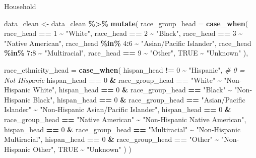 \documentclass[
]{article}
\newenvironment{Shaded}{\begin{snugshade}}{\end{snugshade}}
\newcommand{\AttributeTok}[1]{\textcolor[rgb]{0.13,0.29,0.53}{#1}}
\newcommand{\CommentTok}[1]{\textcolor[rgb]{0.56,0.35,0.01}{\textit{#1}}}
\newcommand{\ConstantTok}[1]{\textcolor[rgb]{0.56,0.35,0.01}{#1}}
\newcommand{\DecValTok}[1]{\textcolor[rgb]{0.00,0.00,0.81}{#1}}
\newcommand{\FunctionTok}[1]{\textcolor[rgb]{0.13,0.29,0.53}{\textbf{#1}}}
\newcommand{\NormalTok}[1]{#1}
\newcommand{\OtherTok}[1]{\textcolor[rgb]{0.56,0.35,0.01}{#1}}
\newcommand{\SpecialCharTok}[1]{\textcolor[rgb]{0.81,0.36,0.00}{\textbf{#1}}}
\newcommand{\StringTok}[1]{\textcolor[rgb]{0.31,0.60,0.02}{#1}}
\begin{document}
Household

\begin{Shaded}
\begin{Highlighting}[]
\NormalTok{data\_clean }\OtherTok{\textless{}{-}}\NormalTok{ data\_clean }\SpecialCharTok{\%\textgreater{}\%}
  \FunctionTok{mutate}\NormalTok{(}
    \AttributeTok{race\_group\_head =} \FunctionTok{case\_when}\NormalTok{(}
\NormalTok{      race\_head }\SpecialCharTok{==} \DecValTok{1} \SpecialCharTok{\textasciitilde{}} \StringTok{"White"}\NormalTok{,}
\NormalTok{      race\_head }\SpecialCharTok{==} \DecValTok{2} \SpecialCharTok{\textasciitilde{}} \StringTok{"Black"}\NormalTok{,}
\NormalTok{      race\_head }\SpecialCharTok{==} \DecValTok{3} \SpecialCharTok{\textasciitilde{}} \StringTok{"Native American"}\NormalTok{,}
\NormalTok{      race\_head }\SpecialCharTok{\%in\%} \DecValTok{4}\SpecialCharTok{:}\DecValTok{6} \SpecialCharTok{\textasciitilde{}} \StringTok{"Asian/Pacific Islander"}\NormalTok{,}
\NormalTok{      race\_head }\SpecialCharTok{\%in\%} \DecValTok{7}\SpecialCharTok{:}\DecValTok{8} \SpecialCharTok{\textasciitilde{}} \StringTok{"Multiracial"}\NormalTok{,}
\NormalTok{      race\_head }\SpecialCharTok{==} \DecValTok{9} \SpecialCharTok{\textasciitilde{}} \StringTok{"Other"}\NormalTok{,}
      \ConstantTok{TRUE} \SpecialCharTok{\textasciitilde{}} \StringTok{"Unknown"}
\NormalTok{    ),}
    
    \AttributeTok{race\_ethnicity\_head =} \FunctionTok{case\_when}\NormalTok{(}
\NormalTok{      hispan\_head }\SpecialCharTok{!=} \DecValTok{0} \SpecialCharTok{\textasciitilde{}} \StringTok{"Hispanic"}\NormalTok{,  }\CommentTok{\# 0 = Not Hispanic}
\NormalTok{      hispan\_head }\SpecialCharTok{==} \DecValTok{0} \SpecialCharTok{\&}\NormalTok{ race\_group\_head }\SpecialCharTok{==} \StringTok{"White"} \SpecialCharTok{\textasciitilde{}} \StringTok{"Non{-}Hispanic White"}\NormalTok{,}
\NormalTok{      hispan\_head }\SpecialCharTok{==} \DecValTok{0} \SpecialCharTok{\&}\NormalTok{ race\_group\_head }\SpecialCharTok{==} \StringTok{"Black"} \SpecialCharTok{\textasciitilde{}} \StringTok{"Non{-}Hispanic Black"}\NormalTok{,}
\NormalTok{      hispan\_head }\SpecialCharTok{==} \DecValTok{0} \SpecialCharTok{\&}\NormalTok{ race\_group\_head }\SpecialCharTok{==} \StringTok{"Asian/Pacific Islander"} \SpecialCharTok{\textasciitilde{}} \StringTok{"Non{-}Hispanic Asian/Pacific Islander"}\NormalTok{,}
\NormalTok{      hispan\_head }\SpecialCharTok{==} \DecValTok{0} \SpecialCharTok{\&}\NormalTok{ race\_group\_head }\SpecialCharTok{==} \StringTok{"Native American"} \SpecialCharTok{\textasciitilde{}} \StringTok{"Non{-}Hispanic Native American"}\NormalTok{,}
\NormalTok{      hispan\_head }\SpecialCharTok{==} \DecValTok{0} \SpecialCharTok{\&}\NormalTok{ race\_group\_head }\SpecialCharTok{==} \StringTok{"Multiracial"} \SpecialCharTok{\textasciitilde{}} \StringTok{"Non{-}Hispanic Multiracial"}\NormalTok{,}
\NormalTok{      hispan\_head }\SpecialCharTok{==} \DecValTok{0} \SpecialCharTok{\&}\NormalTok{ race\_group\_head }\SpecialCharTok{==} \StringTok{"Other"} \SpecialCharTok{\textasciitilde{}} \StringTok{"Non{-}Hispanic Other"}\NormalTok{,}
      \ConstantTok{TRUE} \SpecialCharTok{\textasciitilde{}} \StringTok{"Unknown"}
\NormalTok{    )}
\NormalTok{  )}


\end{Highlighting}
\end{Shaded}
\end{document}
